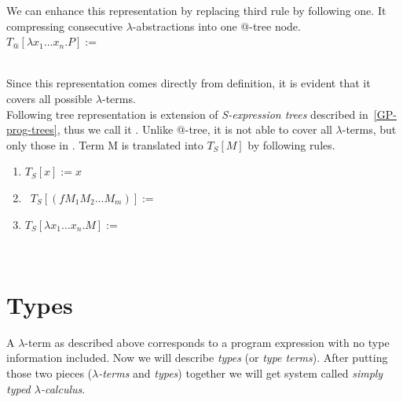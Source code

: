\documentclass[12pt,a4paper]{report}
\makeatletter
\newcommand{\lterm}{$\lambda$-term\xspace}
\newcommand{\lterms}{$\lambda$-terms\xspace}
\newcommand{\atTree}{@-tree\xspace}
\makeatother
\begin{document}
We can enhance this representation by replacing third rule
by following one. It compressing consecutive 
$\lambda$-abstractions into one \atTree node. \\

\mbox{$T_@[\lambda x_1 \dots x_n . P] := $  } 
	
	~\\

Since this representation comes directly from definition, 
it is evident that it covers all possible \lterms.\\
 
Following tree representation is extension of 
\textit{S-expression trees} described in~\ref{GP-prog-trees},
thus we call it \textit{\sexprTree}.
Unlike \atTree, it is not able to cover all \lterms, but only those
in \bnf. 
Term M is translated into \sexprTree $T_S[M]$ by following rules.



\begin{enumerate}
    \item $T_S[x] := x$
	\item \mbox{ $T_S[(f M_1 M_2 \dots M_m)] := $ 
		 }
	\item \mbox{$T_S[\lambda x_1 \dots x_n . M] := $
	 	 }
\end{enumerate}~




\newpage
\section{Types}
\label{deftype}

\newcommand{\ar}{\rightarrow\xspace}
\newcommand{\T}{\mathbb{T}\xspace}

A \lterm as described above
corresponds to a program expression with no type information
included. Now we will describe \textit{types} (or \textit{type terms}).
After putting those two pieces 
(\textit{\lterms} and \textit{types}) together 
we will get system called \textit{simply typed $\lambda$-calculus}.
\end{document}

